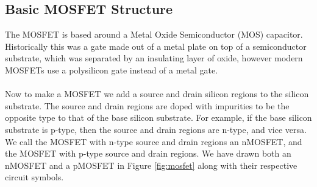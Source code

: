 \documentclass[
  reprint,
  amsmath,amssymb,
  aps
]{revtex4-1}
\begin{document}
\subsection*{Basic MOSFET Structure}
The MOSFET is based around a Metal Oxide Semiconductor (MOS) capacitor. Historically this 
was a gate made out of a metal plate on top of a semiconductor substrate, which was separated by an insulating layer of oxide, however modern 
MOSFETs use a polysilicon gate instead of a metal gate.\\\\
Now to make a MOSFET we add a source and drain silicon regions to the silicon substrate. The source and drain regions are doped with impurities to
be the opposite type to that of the base silicon substrate. For example, if the base silicon substrate is p-type, then the source and drain regions
are n-type, and vice versa. We call the MOSFET with n-type source and drain regions an nMOSFET, and the MOSFET with p-type source and drain regions. We have 
drawn both an nMOSFET and a pMOSFET in Figure \ref{fig:mosfet} along with their respective circuit symbols.\\\\
\end{document}
